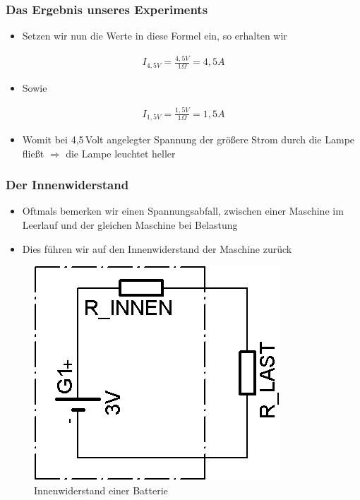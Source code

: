 \begin{frame}
  \frametitle{Das Ergebnis unseres Experiments}
  \begin{itemize}
    \item Setzen wir nun die Werte in diese Formel ein, so erhalten wir
  \end{itemize}
  \begin{align}
    I_{4,5 V} = \frac{4,5 V}{1 \Omega} = 4,5 A
  \end{align}
  \begin{itemize}
    \item Sowie
  \end{itemize}
  \begin{align}
    I_{1,5 V} = \frac{1,5 V}{1 \Omega} = 1,5 A
  \end{align}
  \begin{itemize}
    \item Womit bei 4,5\,Volt angelegter Spannung der größere Strom durch die Lampe fließt $\Rightarrow$ die Lampe leuchtet heller
  \end{itemize}
\end{frame}

\begin{frame}
  \frametitle{Der Innenwiderstand}
  \begin{itemize}
    \item Oftmals bemerken wir einen Spannungsabfall, zwischen einer Maschine im Leerlauf und der gleichen Maschine bei Belastung
    \item Dies führen wir auf den Innenwiderstand der Maschine zurück
  \end{itemize}
  \begin{center}
    \begin{figure}
      \includegraphics[scale=1.4]{e03/Innenwiderstand.png}
      \caption{Innenwiderstand einer Batterie}
    \end{figure}
  \end{center}
\end{frame}

